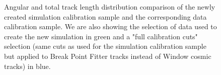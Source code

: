 \begin{figure}[!ht]

\caption{Angular and total track length distribution comparison of the newly created simulation calibration sample and the corresponding data calibration sample. We are also showing the selection of data used to create the new simulation in green and a "full calibration cuts" selection (same cuts as used for the simulation calibration sample but applied to Break Point Fitter tracks instead of Window cosmic tracks) in blue.}
\label{figDataMCComparison_cosZtotLength}
\end{figure}


